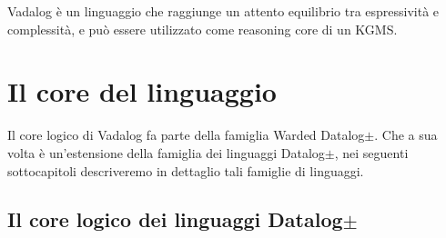 Vadalog è un linguaggio che raggiunge un attento equilibrio tra espressività e complessità, e può essere utilizzato come reasoning core di un KGMS. \newline 

\section{Il core del linguaggio}

Il core logico di Vadalog fa parte della famiglia Warded Datalog$\pm $. Che a sua volta è un'estensione della famiglia dei linguaggi Datalog$\pm$, nei seguenti sottocapitoli descriveremo in dettaglio tali famiglie di linguaggi.

\subsection{Il core logico dei linguaggi Datalog$\pm$}

